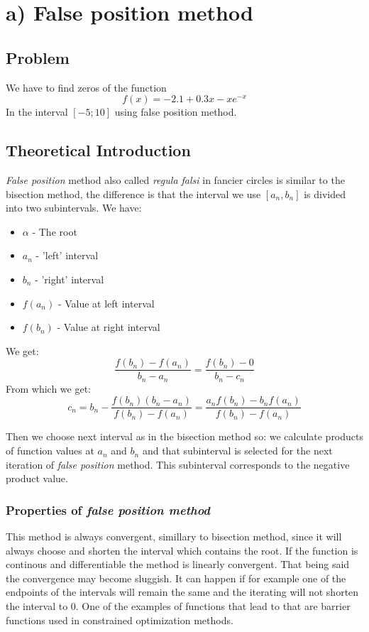 \section{a) False position method}

\subsection{Problem}

We have to find zeros of the function
\[ f(x) = -2.1 + 0.3x - xe^{-x} \]
In the interval $[-5; 10]$ using false position method.

\subsection{Theoretical Introduction}
\emph{False position} method also called \emph{regula falsi} in fancier circles is similar to the bisection method, the difference is that the interval we use $[a_n, b_n]$ is divided into two subintervals. We have:
\begin{itemize}
\item $\alpha$ - The root
\item $a_n$ - 'left' interval
\item $b_n$ - 'right' interval
\item $f(a_n)$ - Value at left interval
\item $f(b_n)$ - Value at right interval
\end{itemize}

We get:
\[ \frac{f(b_n) - f(a_n)}{b_n - a_n} = \frac{f(b_n) - 0}{b_n - c_n} \]
From which we get:
\[ c_n = b_n - \frac{f(b_n)(b_n - a_n)}{f(b_n) - f(a_n)} = \frac{a_nf(b_n) - b_n f(a_n)}{f(b_n)-f(a_n)} \]

Then we choose next interval as in the bisection method so: we calculate products of function values at $a_n$ and $b_n$ and that subinterval is selected for the next iteration of \emph{false position} method. This subinterval corresponds to the negative product value.

\subsubsection{Properties of \emph{false position method}}
This method is always convergent, simillary to bisection method, since it will always choose and shorten the interval which contains the root. If the function is continous and differentiable the method is linearly convergent. That being said the convergence may become sluggish. It can happen if for example one of the endpoints of the intervals will remain the same and the iterating will not shorten the interval to 0. One of the examples of functions that lead to that are barrier functions used in constrained optimization methods.

